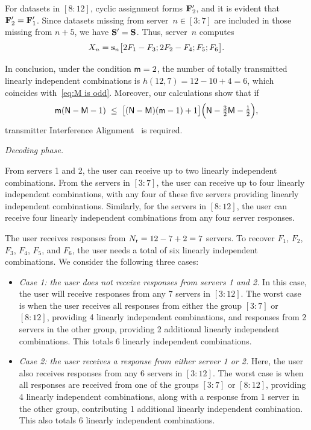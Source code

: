 \documentclass[conference,letterpaper]{IEEEtran}
\begin{document}
\begin{example}
For datasets in \([8{:}12]\), cyclic assignment forms \({\bf F}'_2\), and it is evident that \({\bf F}'_2 = {\bf F}'_1\). Since datasets missing from server~\(n \in [3{:}7]\) are included in those missing from \(n+5\), we have \({\bf S}' = {\bf S}\). Thus, server~\(n\) computes
\[
X_n = {\bf s}_n \bigl[2F_1 - F_3; 2F_2 - F_4; F_5; F_6\bigr].
\]
 


In conclusion, under the condition ${\sf m} = 2$, the number of totally transmitted linearly independent combinations is $h(12,7) = 12 - 10 + 4 = 6$, which coincides with~\eqref{eq:M is odd}. Moreover, our calculations show that if
\[
{\sf m}({\sf N} - {\sf M} - 1) \;\leq\; \bigl[({\sf N} - {\sf M})({\sf m} - 1) + 1\bigr]\Bigl({\sf N} - \tfrac{3}{2}{\sf M} - \tfrac{1}{2}\Bigr),
\]
transmitter Interference Alignment~\cite{2008Interference_Alignment, MIMO_interference_channel, huang2023ISITversion} is required.
  



\iffalse
{\it Decoding phase.}

From servers 1 and 2, the user can receive up to two linearly independent combinations. From the servers in $[3:7]$, the user can receive up to four linearly independent combinations, with any four of these five servers providing linearly independent combinations. Similarly, for the servers in $[8:12]$, the user can receive four linearly independent combinations from any four server responses.

The user receives responses from $N_{\rm r} = 12 - 7 + 2 = 7$ servers.
To recover $F_1$, $F_2$, $F_3$, $F_4$, $F_5$, and $F_6$, the user needs a total of six linearly independent combinations. We consider the following three cases:
\begin{itemize}
\item {\it Case 1: the user does not receive responses from servers 1 and 2.} In this case, the user will receive responses from any 7 servers in $[3:12]$. The worst case is when the user receives all responses from either the group $[3:7]$ or $[8:12]$, providing 4 linearly independent combinations, and responses from 2 servers in the other group, providing 2 additional linearly independent combinations. This totals 6 linearly independent combinations.

\item {\it Case 2: the user receives a response from either server 1 or 2.} Here, the user also receives responses from any 6 servers in $[3:12]$. The worst case is when all responses are received from one of the groups $[3:7]$ or $[8:12]$, providing 4 linearly independent combinations, along with a response from 1 server in the other group, contributing 1 additional linearly independent combination. This also totals 6 linearly independent combinations.


\end{itemize}
\end{example}
\end{document}
